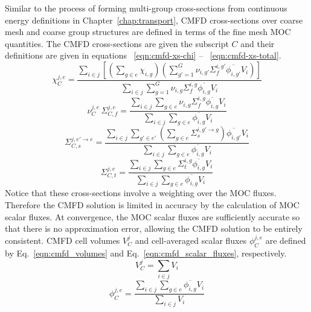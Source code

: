 Similar to the process of forming multi-group cross-sections from continuous energy definitions in Chapter~\ref{chap:transport}, \ac{CMFD} cross-sections over coarse mesh and coarse group structures are defined in terms of the fine mesh \ac{MOC} quantities. The \ac{CMFD} cross-sections are given the subscript $C$ and their definitions are given in equations ~\ref{eqn:cmfd-xs-chi} -- ~\ref{eqn:cmfd-xs-total}. 
\begin{equation}
	\chi_C^{j,e} = \frac{\sum_{i \in j} \left[ \left(\sum_{g \in e} \chi_{i,g} \right) \left(\sum_{g'=1}^{G} \nu_{i, g'} \Sigma_f^{i,g'} \overline{\phi_{i,g'}} V_i \right)\right]}{\sum_{i \in j} \sum_{g=1}^{G} \nu_{i, g} \Sigma_f^{i,g} \overline{\phi_{i,g}} V_i}
	\label{eqn:cmfd-xs-chi}
\end{equation}
\begin{equation}
	\nu_C^{j,e} \, \Sigma_{C,f}^{j,e} = \frac{\sum_{i \in j} \sum_{g \in e} \nu_{i, g} \Sigma_f^{i,g} \overline{\phi_{i,g}} V_i}{\sum_{i \in j} \sum_{g \in e} \overline{\phi_{i,g}} V_i}
\end{equation}
\begin{equation}
	\Sigma_{C,s}^{j, e' \rightarrow e} = \frac{\sum_{i \in j} \sum_{g'\in e'} \left(\sum_{g \in e} \Sigma_{s}^{i, g' \rightarrow g} \right) \overline{\phi_{i,g'}} V_i}{\sum_{i \in j} \sum_{g\in e} \overline{\phi_{i,g}} V_i}
\end{equation}
\begin{equation}
	\Sigma_{C,t}^{j, e} = \frac{\sum_{i \in j} \sum_{g \in e} \Sigma_{t}^{i, g} \overline{\phi_{i,g}} V_i}{\sum_{i \in j} \sum_{g\in e} \overline{\phi_{i,g}} V_i}
	\label{eqn:cmfd-xs-total}
\end{equation}
Notice that these cross-sections involve a weighting over the \ac{MOC} fluxes. Therefore the \ac{CMFD} solution is limited in accuracy by the calculation of \ac{MOC} scalar fluxes. At convergence, the \ac{MOC} scalar fluxes are sufficiently accurate so that there is no approximation error, allowing the \ac{CMFD} solution to be entirely consistent. \ac{CMFD} cell volumes $V_C^j$ and cell-averaged scalar fluxes $\phi_C^{j,e}$ are defined by Eq.~\ref{eqn:cmfd_volumes} and Eq.~\ref{eqn:cmfd_scalar_fluxes}, respectively.
\begin{equation}
	V_C^j = \sum_{i \in j} V_i
	\label{eqn:cmfd_volumes}
\end{equation}
\begin{equation}
\phi_C^{j,e} = \frac{\sum_{i \in j} \sum_{g \in e} \overline{\phi_{i,g}} V_i}{\sum_{i \in j} V_i}
\label{eqn:cmfd_scalar_fluxes}
\end{equation}
